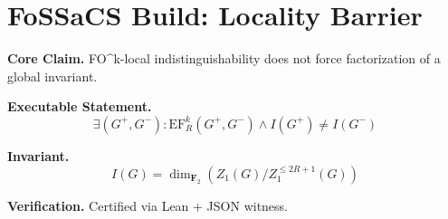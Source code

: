 \section*{FoSSaCS Build: Locality Barrier}

\textbf{Core Claim.}
FO^k-local indistinguishability does not force factorization of a global invariant.

\textbf{Executable Statement.}
\[
\exists (G^+,G^-): \mathrm{EF}^k_R(G^+,G^-) \wedge I(G^+) \neq I(G^-)
\]

\textbf{Invariant.}
\[
I(G) = \dim_{\mathbf{F}_2}(Z_1(G)/Z_1^{\le 2R+1}(G))
\]

\textbf{Verification.}
Certified via Lean + JSON witness.
